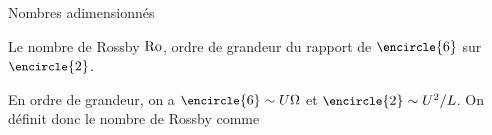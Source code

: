 \begin{exo}[PC][2][appli]{Nombres adimensionnés}
  \begin{enonce}
  	Le nombre de Rossby ${\rm Ro}$, ordre de grandeur du rapport de ${\small\encircle{6}}$ sur ${\small\encircle{2}}$.
  \end{enonce}


  \begin{corrige}
    En ordre de grandeur, on a ${\small\encircle{6}} \sim U \Omega$ et ${\small\encircle{2}} \sim U^2/L$. On définit donc le nombre de Rossby comme
  \end{corrige}

\end{exo}

